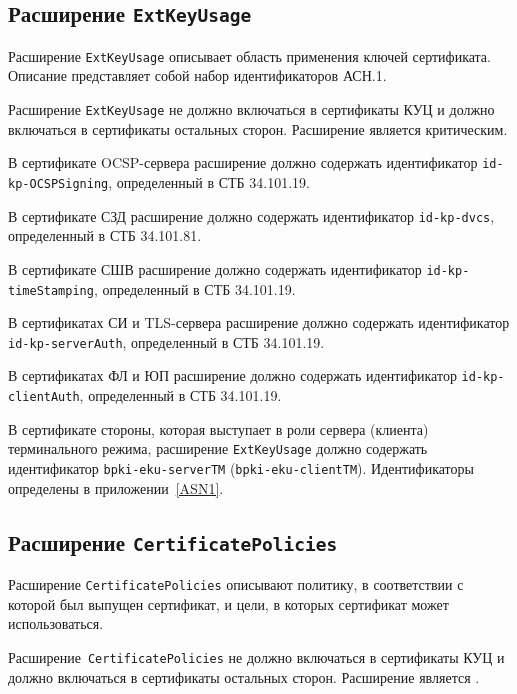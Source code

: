 
\subsection{Расширение \texttt{ExtKeyUsage}}\label{FMT.Ext.EKU}

Расширение \texttt{ExtKeyUsage} описывает область применения ключей 
сертификата. Описание представляет собой набор идентификаторов АСН.1. 

Расширение \texttt{ExtKeyUsage} не должно включаться в сертификаты КУЦ
и должно включаться в сертификаты остальных сторон.
Расширение является критическим.

В сертификате OCSP-сервера расширение должно содержать
идентификатор \verb|id-kp-OCSPSigning|, определенный в СТБ 34.101.19.

В сертификате СЗД расширение должно содержать
идентификатор \verb|id-kp-dvcs|, определенный в СТБ 34.101.81.

В сертификате СШВ расширение должно содержать
идентификатор \verb|id-kp-timeStamping|, определенный в СТБ 34.101.19.

В сертификатах СИ и TLS-сервера расширение должно содержать
идентификатор \verb|id-kp-serverAuth|, определенный в СТБ 34.101.19.

В сертификатах ФЛ и ЮП расширение должно содержать
идентификатор \verb|id-kp-clientAuth|, определенный в СТБ 34.101.19.

В сертификате стороны, которая выступает в роли сервера (клиента) 
терминального режима, расширение \texttt{ExtKeyUsage} должно содержать 
идентификатор \verb|bpki-eku-serverTM|  
(\verb|bpki-eku-clientTM|). Идентификаторы определены в приложении~\ref{ASN1}.


\subsection{Расширение \texttt{CertificatePolicies}}\label{FMT.Ext.CP}

Расширение \texttt{CertificatePolicies} описывают политику, в соответствии 
с которой был выпущен сертификат, и цели, в которых сертификат может 
использоваться. 

Расширение~\texttt{CertificatePolicies} не должно включаться в сертификаты
КУЦ и должно включаться в сертификаты остальных сторон. 
Расширение является .

